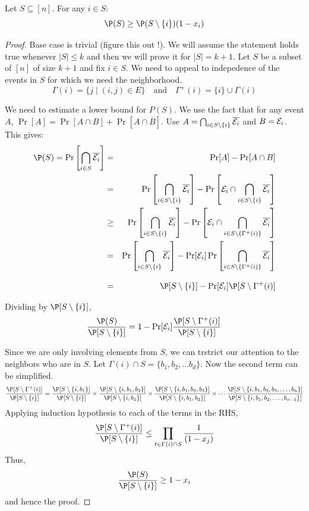 \begin{lemma}
Let $S \subseteq [n]$. For any $i \in S$: 
$$\P(S) \ge \P(S\setminus\{i\})(1-x_i)$$
\end{lemma}
\begin{proof}
Base case is trivial (figure this out !). We will assume the statement holds true whenever $|S|\le k$ and then we will prove it for $|S|=k+1$. Let $S$ be a subset of $[n]$ of size $k+1$ and fix $i \in S$. We need to appeal to indepedence of the events in $S$ for which we need the neighborhood.
$$\Gamma(i) = \{j \mid (i,j) \in E \} \textrm{ ~~and~~ } \Gamma^+(i) = \{i\} \cup \Gamma(i)$$

We need to estimate a lower bound for $P(S)$. We use the fact that for any event $A$, $\Pr[A] = \Pr[A \cap B]+\Pr[A \cap \overline{B}]$. Use $A = 
\bigcap_{i\in S\setminus\{i\}} \overline{{\cal E}_i}$ and $B={\cal E}_i$. This gives:
\begin{eqnarray*}
\P(S) = \Pr\left[\bigcap_{i\in S} \overline{\calE_i}\right] & = & \Pr[A] - \Pr[A \cap B] \\
& = & \Pr\left[\bigcap_{i\in S\setminus\{i\}} \overline{\calE_i} \right] - 
\Pr\left[\calE_i \cap \bigcap_{i\in S\setminus\{i\}}\overline{\calE_i} \right] \\
& \ge & 
\Pr\left[\bigcap_{i\in S\setminus\{i\}} \overline{\calE_i} \right] - 
\Pr\left[\calE_i \cap \bigcap_{i\in S\setminus\{\Gamma^+(i)\}}\overline{\calE_i} \right] \\
& = & 
\Pr\left[\bigcap_{i\in S\setminus\{i\}} \overline{\calE_i} \right] - 
\Pr[\calE_i]\Pr\left[\bigcap_{i\in S\setminus\{\Gamma^+(i)\}}\overline{\calE_i} \right] \\[3mm]
& = & 
\P[S\setminus\{i\}]-\Pr[\calE_i]\P[S\setminus\Gamma^+(i)]
\end{eqnarray*}

Dividing by $\P[S\setminus\{i\}]$,
\[ \frac{\P(S)}{\P[S\setminus\{i\}]} = 1-\Pr[\calE_i]\frac{\P[S\setminus\Gamma^+(i)]}{\P[S\setminus\{i\}]} \]

Since we are only involving elements from $S$, we can trstrict our attention to the neighbors who are in $S$. Let $\Gamma(i) \cap S = \{b_1,b_2, \ldots b_d\}$. Now the second term can be simplified.
$$\frac{\P[S\setminus\Gamma^+(i)]}{\P[S\setminus\{i\}]} = \frac{\P[S\setminus\{i,b_1\}]}{\P[S\setminus\{i\}]}\times
\frac{\P[S\setminus\{i,b_1,b_2\}]}{\P[S\setminus\{i,b_1\}]}\times
\frac{\P[S\setminus\{i,b_1,b_2,b_3\}]}{\P[S\setminus\{i,b_1,b_2\}]}\times
\cdots
\frac{\P[S\setminus\{i,b_1,b_2,b_3,\ldots,b_n\}]}{\P[S\setminus\{i,b_1,b_2,\ldots,b_{n-1}\}]}
$$
Applying induction hypothesis to each of the terms in the RHS,
$$\frac{\P[S\setminus\Gamma^+(i)]}{\P[S\setminus\{i\}]} \le \prod_{t \in \Gamma(i) \cap S} \frac{1}{(1-x_j)} 
$$
Thus, \[ \frac{\P(S)}{\P[S\setminus\{i\}]} \ge 1-x_i \]
and hence the proof.
\end{proof}


